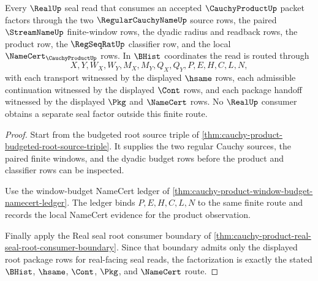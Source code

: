 \begin{theorem}
\label{thm:cauchy-product-root-real-seal-factorization}
Every $\RealUp$ seal read that consumes an accepted $\CauchyProductUp$ packet factors through the two $\RegularCauchyNameUp$ source rows, the paired $\StreamNameUp$ finite-window rows, the dyadic radius and readback rows, the product row, the $\RegSeqRatUp$ classifier row, and the local $\NameCert_{\CauchyProductUp}$ rows. In $\BHist$ coordinates the read is routed through
$$
X,Y,W_X,W_Y,M_X,M_Y,Q_X,Q_Y,P,E,H,C,L,N,
$$
with each transport witnessed by the displayed $\hsame$ rows, each admissible continuation witnessed by the displayed $\Cont$ rows, and each package handoff witnessed by the displayed $\Pkg$ and $\NameCert$ rows. No $\RealUp$ consumer obtains a separate seal factor outside this finite route.
\end{theorem}
\begin{proof}
Start from the budgeted root source triple of \autoref{thm:cauchy-product-budgeted-root-source-triple}. It supplies the two regular Cauchy sources, the paired finite windows, and the dyadic budget rows before the product and classifier rows can be inspected.

Use the window-budget NameCert ledger of \autoref{thm:cauchy-product-window-budget-namecert-ledger}. The ledger binds $P,E,H,C,L,N$ to the same finite route and records the local NameCert evidence for the product observation.

Finally apply the Real seal root consumer boundary of \autoref{thm:cauchy-product-real-seal-root-consumer-boundary}. Since that boundary admits only the displayed root package rows for real-facing seal reads, the factorization is exactly the stated $\BHist$, $\hsame$, $\Cont$, $\Pkg$, and $\NameCert$ route.
\end{proof}

